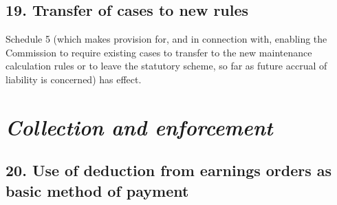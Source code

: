 \documentclass[12pt,a4paper]{article}
\begin{document}

\subsection{19. Transfer of cases to new rules}

Schedule 5 (which makes provision for, and in connection with, enabling the Commission to require existing cases to transfer to the new maintenance calculation rules or to leave the statutory scheme, so far as future accrual of liability is concerned) has effect. 

\section{\itshape Collection and enforcement}

\subsection{20. Use of deduction from earnings orders as basic method of payment}
\end{document}

